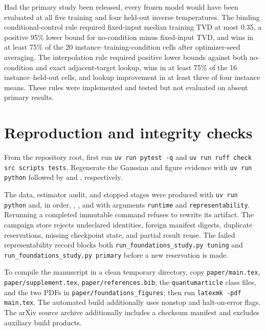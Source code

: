 Had the primary study been released, every frozen model would have been
evaluated at all five training and four held-out inverse temperatures.  The
binding conditional-control rule required fixed-input median training TVD at
most 0.35, a positive 95\% lower bound for no-condition minus fixed-input TVD,
and wins in at least 75\% of the 20 instance--training-condition cells after
optimizer-seed averaging.  The interpolation rule required positive lower
bounds against both no-condition and exact adjacent-target lookup, wins in at
least 75\% of the 16 instance--held-out cells, and lookup improvement in at
least three of four instance means.  These rules were implemented and tested
but not evaluated on absent primary results.

\section{Reproduction and integrity checks}
\label{app:reproduction}

From the repository root, first run \texttt{uv run pytest -q} and
\texttt{uv run ruff check src scripts tests}.  Regenerate the Gaussian and
figure evidence with \texttt{uv run python} followed by
 and
, respectively.

The data, estimator audit, and stopped stages were produced with
\texttt{uv run python} and, in order,
,
, and
 with arguments \texttt{runtime} and
\texttt{representability}.
Rerunning a completed immutable command refuses to rewrite its artifact.  The
campaign store rejects undeclared identities, foreign manifest digests,
duplicate reservations, missing checkpoint state, and partial result reuse.
The failed representability record blocks both
\texttt{run\_foundations\_study.py tuning} and
\texttt{run\_foundations\_study.py primary} before a new reservation is made.

To compile the manuscript in a clean temporary directory, copy
\texttt{paper/main.tex}, \texttt{paper/supplement.tex},
\texttt{paper/references.bib}, the \texttt{quantumarticle} class files, and the
two PDFs in \texttt{paper/foundations\_figures}; then run
\texttt{latexmk -pdf main.tex}.  The automated build additionally uses
nonstop and halt-on-error flags.
The arXiv source archive additionally includes a checksum manifest and excludes
auxiliary build products.
